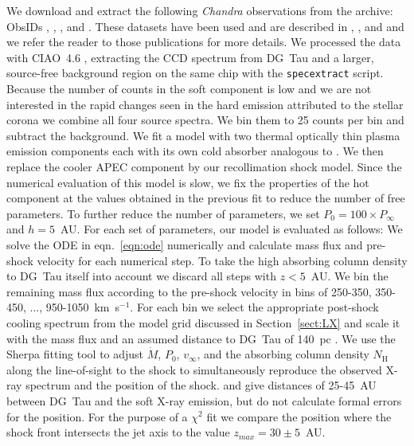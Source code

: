 \documentclass{emulateapj}
\begin{document}
We download and extract the following \emph{Chandra} observations from the archive: ObsIDs , , , and . These datasets have been used and are described in \citet{2008A&A...478..797G}, \citet{2008A&A...488L..13S}, and \citet{2009A&A...493..579G} and we refer the reader to those publications for more details. We processed the data with CIAO~4.6 \citep{2006SPIE.6270E..60F}, extracting the CCD spectrum from DG~Tau and a larger, source-free background region on the same chip with the \texttt{specextract} script. Because the number of counts in the soft component is low and we are not interested in the rapid changes seen in the hard emission attributed to the stellar corona \citep{2008A&A...478..797G} we combine all four source spectra. We bin them to 25 counts per bin and subtract the background. We fit a model with two thermal optically thin plasma emission components \citep[APEC,][]{2012ApJ...756..128F} each with its own cold absorber analogous to \citet{2008A&A...478..797G}. We then replace the cooler APEC component by our recollimation shock model. Since the numerical evaluation of this model is slow, we fix the properties of the hot component at the values obtained in the previous fit to reduce the number of free parameters. To further reduce the number of parameters, we set $P_0 = 100\times P_\infty$ and $h=5$~AU. For each set of parameters, our model is evaluated as follows: We solve the ODE in eqn.~\ref{eqn:ode} numerically and calculate mass flux and pre-shock velocity for each numerical step. To take the high absorbing column density to DG~Tau itself into account we discard all steps with $z<5$~AU. We bin the remaining mass flux according to the pre-shock velocity in bins of 250-350, 350-450, ..., 950-1050~km~s$^{-1}$. For each bin we select the appropriate post-shock cooling spectrum from the model grid discussed in Section~\ref{sect:LX} and scale it with the mass flux and an assumed distance to DG~Tau of 140~pc \citep{1994AJ....108.1872K}. We use the Sherpa fitting tool \citep{2001SPIE.4477...76F} to adjust $\dot M$, $P_0$, $v_\infty$, and the absorbing column density $N_\textrm{H}$ along the line-of-sight to the shock to simultaneously reproduce the observed X-ray spectrum and the position of the shock. \citet{2008A&A...488L..13S} and \citet{2011ASPC..448..617G} give distances of 25-45~AU between DG~Tau and the soft X-ray emission, but do not calculate formal errors for the position. For the purpose of a $\chi^2$ fit we compare the position where the shock front intersects the jet axis to the value $z_{max} = 30\pm5$~AU.
\end{document}
